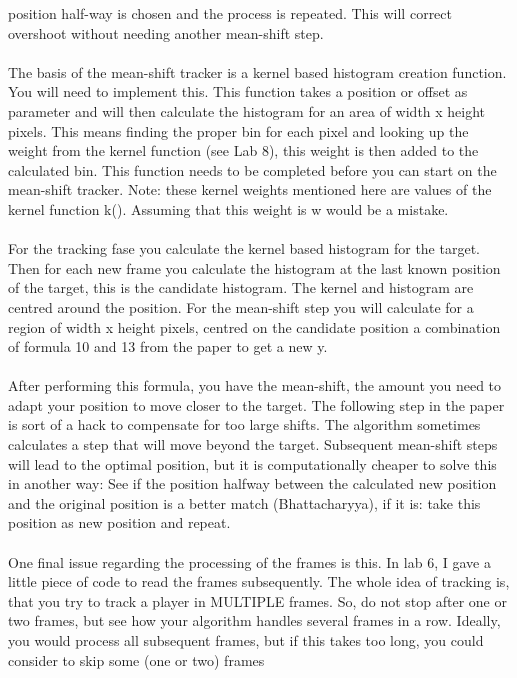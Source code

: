 \documentclass[a4paper,11pt]{article}
\begin{document}
		position half-way is chosen and the process is repeated. This will correct overshoot
		without needing another mean-shift step.
		\\ \\
		The basis of the mean-shift tracker is a kernel based histogram creation function.
		You will need to implement this. This function takes a position or offset as parameter
		and will then calculate the histogram for an area of width x height pixels. This means
		finding the proper bin for each pixel and looking up the weight from the kernel function
		(see Lab 8), this weight is then added to the calculated bin. This function needs to be
		completed before you can start on the mean-shift tracker. Note: these kernel weights
		mentioned here are values of the kernel function k(). Assuming that this weight is w
		would be a mistake.
		\\ \\
		For the tracking fase you calculate the kernel based histogram for the target. Then
		for each new frame you calculate the histogram at the last known position of the target,
		this is the candidate histogram. The kernel and histogram are centred around the position.
		For the mean-shift step you will calculate for a region of width x height pixels, centred
		on the candidate position a combination of formula 10 and 13 from the paper to get a new y.
		\\ \\
		After performing this formula, you have the mean-shift, the amount you need to adapt your
		position to move closer to the target. The following step in the paper is sort of a hack
		to compensate for too large shifts. The algorithm sometimes calculates a step that will
		move beyond the target. Subsequent mean-shift steps will lead to the optimal position,
		but it is computationally cheaper to solve this in another way: See if the position halfway
		between the calculated new position and the original position is a better match (Bhattacharyya),
		if it is: take this position as new position and repeat.
		\\ \\
		One final issue regarding the processing of the frames is this. In lab 6, I gave a little
		piece of code to read the frames subsequently. The whole idea of tracking is, that you try
		to track a player in MULTIPLE frames. So, do not stop after one or two frames, but see how
		your algorithm handles several frames in a row. Ideally, you would process all subsequent
		frames, but if this takes too long, you could consider to skip some (one or two) frames
\end{document}
